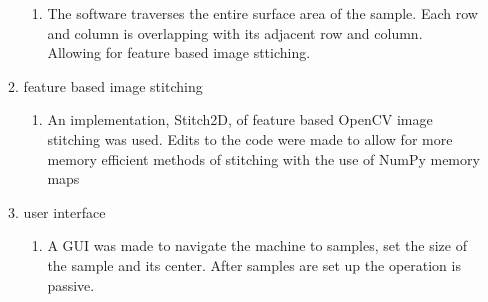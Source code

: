 \documentclass{article}
\begin{document}
\begin{outline}[enumerate]
\begin{enumerate}
\begin{enumerate}
				\begin{enumerate}
				\item The software traverses the entire surface area of the sample. Each row and column is overlapping with its adjacent row and column. Allowing for feature based image sttiching.
				\end{enumerate}
			\item feature based image stitching
				\begin{enumerate}
				\item An implementation, Stitch2D, of feature based OpenCV image stitching was used. Edits to the code were made to allow for more memory efficient methods of stitching with the use of NumPy memory maps
				\end{enumerate}
			\item user interface
				\begin{enumerate}
				\item A GUI was made to navigate the machine to samples, set the size of the sample and its center. After samples are set up the operation is passive.
				\end{enumerate}
			\end{enumerate}
		\end{enumerate}


\end{outline}
\end{document}
